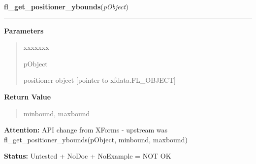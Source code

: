 \hspace{.8\funcindent}\begin{boxedminipage}{\funcwidth}

    \raggedright \textbf{fl\_get\_positioner\_ybounds}(\textit{pObject})

    \vspace{-1.5ex}

    \rule{\textwidth}{0.5\fboxrule}
\setlength{\parskip}{2ex}
\setlength{\parskip}{1ex}
      \textbf{Parameters}
      \vspace{-1ex}

      \begin{quote}
        \begin{Ventry}{xxxxxxx}

          \item[pObject]

          positioner object [pointer to xfdata.FL\_OBJECT]

        \end{Ventry}

      \end{quote}

      \textbf{Return Value}
    \vspace{-1ex}

      \begin{quote}
      minbound, maxbound

      \end{quote}

\textbf{Attention:} API change from XForms - upstream was fl\_get\_positioner\_ybounds(pObject,
minbound, maxbound)



\textbf{Status:} Untested + NoDoc + NoExample = NOT OK



    \end{boxedminipage}

    \label{xformslib:library:fl_set_positioner_xstep}

    \vspace{0.5ex}

